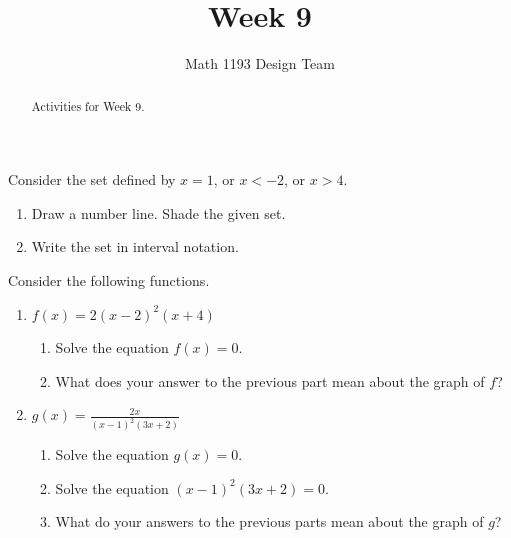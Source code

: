 \documentclass[noauthor]{ximera}
\title{Week 9}
\author{Math 1193 Design Team}
\begin{document}
\begin{abstract}
    Activities for Week 9.
\end{abstract}
\maketitle

\begin{problem}
Consider the set defined by \(x = 1\), or \(x < -2\), or \(x > 4\).

\begin{enumerate}
    \item Draw a number line. Shade the given set.
    \item Write the set in interval notation.
\end{enumerate}
\end{problem}

\begin{problem}
Consider the following functions.

\begin{enumerate}
    \item \(f(x) = 2(x - 2)^2(x + 4)\)
    \begin{enumerate}
        \item Solve the equation \(f(x) = 0\).
        \item What does your answer to the previous part mean about the graph of \(f\)?
    \end{enumerate}
    \item \(g(x) = \frac{2x}{(x - 1)^2(3x + 2)}\)
    \begin{enumerate}
        \item Solve the equation \(g(x) = 0\).
        \item Solve the equation \((x - 1)^2(3x + 2) = 0\).
        \item What do your answers to the previous parts mean about the graph of \(g\)?
    \end{enumerate}
\end{enumerate}

\end{problem}
\end{document}
